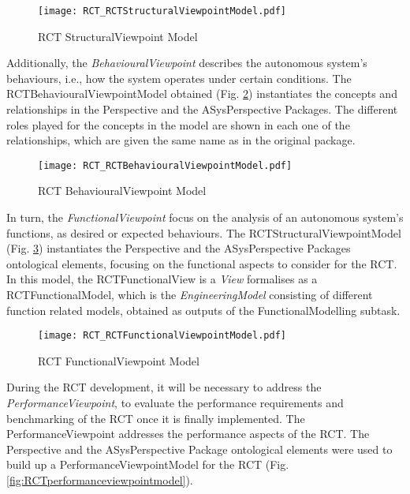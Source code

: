 \begin{figure}[htbp]
\begin{center}
 {\texttt{[image: RCT\_RCTStructuralViewpointModel.pdf]}}
\end{center}
\caption{RCT StructuralViewpoint Model}
\label{fig:RCTstructuralviewpointmodel}
\end{figure}

Additionally, the \emph{BehaviouralViewpoint} describes the autonomous system's behaviours, i.e., how the system operates under certain conditions. The RCTBehaviouralViewpointModel obtained (Fig. \ref{fig:RCTbehaviouralviewpointmodel}) instantiates the concepts and relationships in the Perspective and the ASysPerspective Packages. The different roles played for the concepts in the model are shown in each one of the relationships, which are given the same name as in the original package.\\


\begin{figure}[htbp]
\begin{center}
 {\texttt{[image: RCT\_RCTBehaviouralViewpointModel.pdf]}}
\end{center}
\caption{RCT BehaviouralViewpoint Model}
\label{fig:RCTbehaviouralviewpointmodel}
\end{figure}

In turn, the \emph{FunctionalViewpoint} focus on the analysis of an autonomous system's functions, as desired or expected behaviours. The RCTStructuralViewpointModel (Fig. \ref{fig:RCTfunctionalviewpointmodel}) instantiates the  Perspective and the ASysPerspective Packages ontological elements, focusing on the functional aspects to consider for the RCT. In this model,  the RCTFunctionalView is a \emph{View} formalises as a RCTFunctionalModel, which is the \emph{EngineeringModel} consisting of different function related models, obtained as outputs of the FunctionalModelling subtask.\\

\begin{figure}[htbp]
\begin{center}
 {\texttt{[image: RCT\_RCTFunctionalViewpointModel.pdf]}}
\end{center}
\caption{RCT FunctionalViewpoint Model}
\label{fig:RCTfunctionalviewpointmodel}
\end{figure}



During the RCT development, it will be necessary to address the \emph{PerformanceViewpoint}, to evaluate the performance requirements and benchmarking of the RCT once it is finally implemented. The PerformanceViewpoint addresses the performance aspects of the RCT. The Perspective and the ASysPerspective Package ontological elements were used to build up a PerformanceViewpointModel for the RCT (Fig. \ref{fig:RCTperformanceviewpointmodel}).\\

